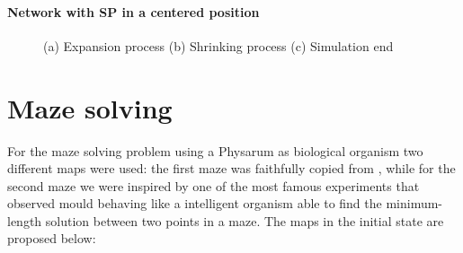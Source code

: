 \paragraph{Network with SP in a centered position}
\begin{figure}[H]
    \centering
    \caption{(a) Expansion process (b) Shrinking process (c) Simulation end}
    \label{fig:foobar}
\end{figure}

\section{Maze solving}

For the maze solving problem using a Physarum as biological organism two different maps were used: the first maze was faithfully copied from \cite{dourvas2016gpgpu}, while for the second maze we were inspired by one of the most famous experiments \cite{nakagaki2000intelligence} that observed mould behaving like a intelligent organism able to find the minimum-length solution between two points in a maze. The maps in the initial state are proposed below:

